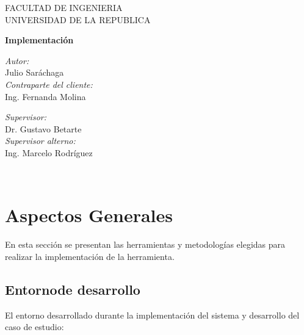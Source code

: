 \documentclass[11pt]{article}
\title{}
\begin{document}
  
\begin{titlepage}

\begin{center}
\vspace*{-1in}

FACULTAD DE INGENIERIA\\
\vspace*{0.15in}
UNIVERSIDAD DE LA REPUBLICA \\
\vspace*{0.6in}
\vspace*{0.2in}
\begin{Large}
\textbf{Implementación} \\
\end{Large}
\vspace*{0.3in}
\end{center}

\begin{minipage}{0.4\textwidth}
\begin{flushleft} \large
\emph{Autor:}\\
Julio Saráchaga\\
\bigskip
\emph{Contraparte del cliente:}\\
Ing. Fernanda Molina
\end{flushleft}
\end{minipage}
\begin{minipage}{0.4\textwidth}
\begin{flushright} \large
\emph{Supervisor:} \\
Dr. Gustavo Betarte\\
\bigskip
\emph{Supervisor alterno:} \\
Ing. Marcelo Rodríguez
\end{flushright}
\end{minipage}\\[3cm]

\end{titlepage}
\bigskip

\section{Aspectos Generales}
En esta sección se presentan las herramientas y metodologías elegidas para realizar la implementación de la herramienta.

\subsection{Entornode desarrollo}
El entorno desarrollado durante la implementación del sistema y desarrollo del caso de estudio:
\end{document}
